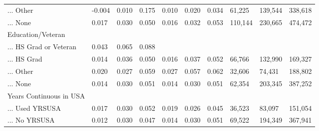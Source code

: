 \documentclass[
  letterpaper,
  DIV=11,
  numbers=noendperiod]{scrartcl}
\begin{document}
\begin{table}[!htbp]
{\begin{tabular}{llllllllll}
... Other & -0.004 & 0.010 & 0.175 & 0.010 & 0.020 & 0.034 & 61,225 & 139,544 & 338,618 \\ 
... None & 0.017 & 0.030 & 0.050 & 0.016 & 0.032 & 0.053 & 110,144 & 230,665 & 474,472 \\ 
Education/Veteran &  &  &  &  &  &  &  &  &  \\ 
... HS Grad or Veteran & 0.043 & 0.065 & 0.088 &  &  &  &  &  &  \\ 
... HS Grad & 0.014 & 0.036 & 0.050 & 0.016 & 0.037 & 0.052 & 66,766 & 132,990 & 169,327 \\ 
... Other & 0.020 & 0.027 & 0.059 & 0.027 & 0.057 & 0.062 & 32,606 & 74,431 & 188,802 \\ 
... None & 0.014 & 0.030 & 0.051 & 0.014 & 0.030 & 0.051 & 62,354 & 203,345 & 387,252 \\ 
Years Continuous in USA &  &  &  &  &  &  &  &  &  \\ 
... Used YRSUSA & 0.017 & 0.030 & 0.052 & 0.019 & 0.026 & 0.045 & 36,523 & 83,097 & 151,054 \\ 
... No YRSUSA & 0.012 & 0.030 & 0.047 & 0.014 & 0.030 & 0.051 & 69,522 & 194,349 & 367,941\\ 
\hline
\hline
\end{tabular}
}
\end{table}
\end{document}
